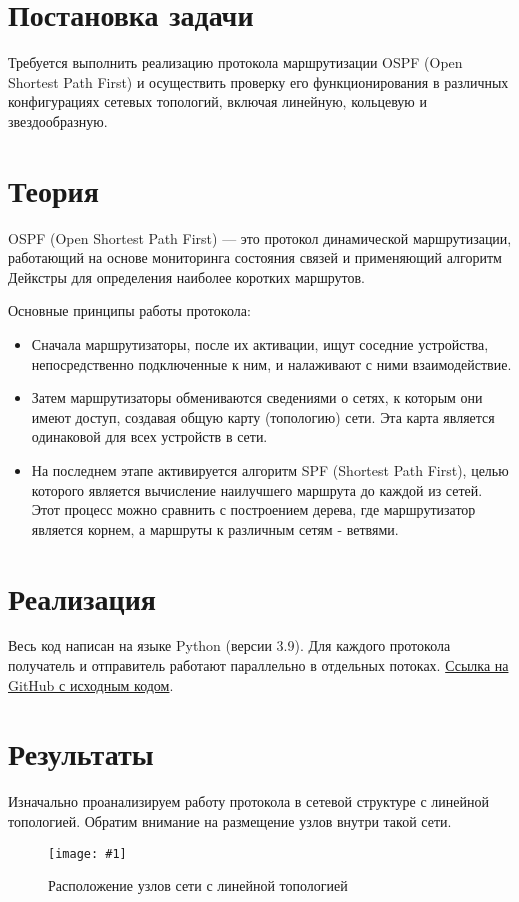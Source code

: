 \documentclass[a4paper,12pt]{article}
\newcommand{\plot}[3]{
    \begin{figure}[H]
        \begin{center}
            \texttt{[image: \#1]}
            \caption{#2}
            \label{#3}
        \end{center}
    \end{figure}
}
\begin{document}
    
    \newpage

    \tableofcontents
    \newpage

    \section{Постановка задачи}\label{sec:-}
    \quad Требуется выполнить реализацию протокола маршрутизации OSPF (Open Shortest Path First) и осуществить проверку его функционирования в различных конфигурациях сетевых топологий, включая линейную, кольцевую и звездообразную.

    \section{Теория}\label{sec:}
    OSPF (Open Shortest Path First) — это протокол динамической маршрутизации, работающий на основе мониторинга состояния связей и применяющий алгоритм Дейкстры для определения наиболее коротких маршрутов.

    Основные принципы работы протокола:
    \begin{itemize}
        \item Сначала маршрутизаторы, после их активации, ищут соседние устройства, непосредственно подключенные к ним, и налаживают с ними взаимодействие.
        \item Затем маршрутизаторы обмениваются сведениями о сетях, к которым они имеют доступ, создавая общую карту (топологию) сети. Эта карта является одинаковой для всех устройств в сети.
        \item На последнем этапе активируется алгоритм SPF (Shortest Path First), целью которого является вычисление наилучшего маршрута до каждой из сетей. Этот процесс можно сравнить с построением дерева, где маршрутизатор является корнем, а маршруты к различным сетям - ветвями.
    \end{itemize}

    \section{Реализация}\label{sec:2}
    \quad Весь код написан на языке Python (версии 3.9).
    Для каждого протокола получатель и отправитель работают параллельно в отдельных потоках.
    \href{https://github.com/gobdr/Networks/tree/master/2_lab}{Ссылка на GitHub с исходным кодом}.

    \section{Результаты}\label{sec:3}
    Изначально проанализируем работу протокола в сетевой структуре с линейной топологией. Обратим внимание на размещение узлов внутри такой сети.
    \plot{full_line_points}{Расположение узлов сети с линейной топологией}{p:fullLinePoints}
\end{document}

